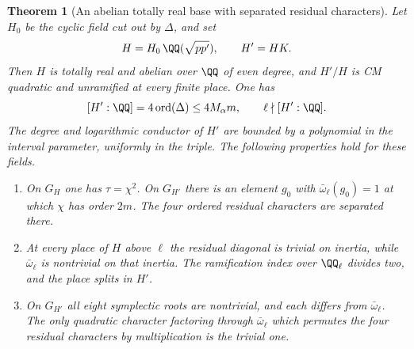 \documentclass[a4paper,11pt]{article}
\newtheorem{theorem}[proposition]{Theorem}
\theoremstyle{definition}
\theoremstyle{remark}
\numberwithin{equation}{section}
\begin{document}
\begin{theorem}[An abelian totally real base with separated residual characters]
\leavevmode\label{thm:tametower571}
Let \(H_0\) be the cyclic field cut out by \(\Delta\), and set
\[
          H=H_0\,\QQ(\sqrt{pp'}),\qquad H'=HK .
\]
Then \(H\) is totally real and abelian over \(\QQ\) of even
degree, and \(H'/H\) is CM quadratic and unramified at every
finite place. One has
\[
     [H':\QQ]=4\operatorname{ord}(\Delta)\le 4M_\alpha m,
        \qquad \ell\nmid[H':\QQ].
\]
The degree and logarithmic conductor of \(H'\) are bounded by
a polynomial in the interval parameter, uniformly in the triple.
The following properties hold for these fields.
\begin{enumerate}
\item On \(G_H\) one has \(\tau=\chi^2\). On \(G_{H'}\) there
is an element \(g_0\) with \(\bar\omega_\ell(g_0)=1\) at
which \(\chi\) has order \(2m\). The four ordered residual
characters are separated there.
\item At every place of \(H\) above \(\ell\) the residual
diagonal is trivial on inertia, while \(\bar\omega_\ell\)
is nontrivial on that inertia. The ramification index over
\(\QQ_\ell\) divides two, and the place splits in \(H'\).
\item On \(G_{H'}\) all eight symplectic roots are nontrivial,
and each differs from \(\bar\omega_\ell\). The only quadratic
character factoring through \(\bar\omega_\ell\) which permutes
the four residual characters by multiplication is the trivial
one.
\end{enumerate}
\end{theorem}
\end{document}
